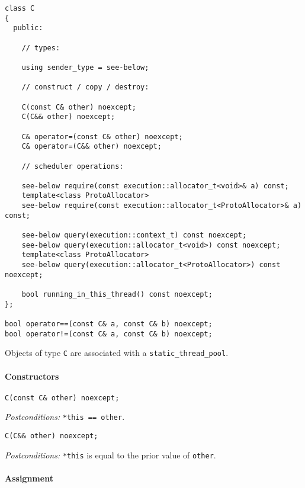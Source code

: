 \documentclass[a4paper,12pt,notitlepage,twoside,openright]{article}
\begin{document}
\begin{verbatim}
class C
{
  public:

    // types:

    using sender_type = see-below;

    // construct / copy / destroy:

    C(const C& other) noexcept;
    C(C&& other) noexcept;

    C& operator=(const C& other) noexcept;
    C& operator=(C&& other) noexcept;

    // scheduler operations:

    see-below require(const execution::allocator_t<void>& a) const;
    template<class ProtoAllocator>
    see-below require(const execution::allocator_t<ProtoAllocator>& a) const;

    see-below query(execution::context_t) const noexcept;
    see-below query(execution::allocator_t<void>) const noexcept;
    template<class ProtoAllocator>
    see-below query(execution::allocator_t<ProtoAllocator>) const noexcept;

    bool running_in_this_thread() const noexcept;
};

bool operator==(const C& a, const C& b) noexcept;
bool operator!=(const C& a, const C& b) noexcept;
\end{verbatim}

Objects of type \texttt{C} are associated with a
\texttt{static_thread_pool}.

\hypertarget{constructors}{%
\paragraph{Constructors}\label{constructors}}

\begin{verbatim}
C(const C& other) noexcept;
\end{verbatim}

\emph{Postconditions:} \texttt{*this == other}.

\begin{verbatim}
C(C&& other) noexcept;
\end{verbatim}

\emph{Postconditions:} \texttt{*this} is equal to the prior
value of \texttt{other}.

\hypertarget{assignment}{%
\paragraph{Assignment}\label{assignment}}
\end{document}
